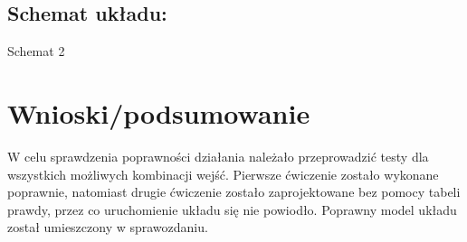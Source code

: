 \documentclass[12pt,a4paper]{article}
\begin{document}
		\subsection{Schemat układu:}
		
			\vspace{0.5cm}
			\begin{center}
				Schemat 2
			\end{center}

	\section{Wnioski/podsumowanie}
			W celu sprawdzenia poprawności działania należało przeprowadzić testy dla wszystkich możliwych kombinacji wejść. Pierwsze ćwiczenie zostało wykonane poprawnie, natomiast drugie ćwiczenie zostało zaprojektowane bez pomocy tabeli prawdy, przez co uruchomienie układu się nie powiodło. Poprawny model układu został umieszczony w sprawozdaniu.
	
\end{document}

